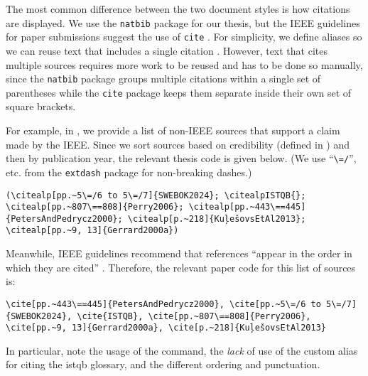 

The most common difference between the two document styles is how citations are
displayed. We use the \texttt{natbib} package for our thesis, but the IEEE
guidelines for paper submissions suggest the use of \texttt{cite}
\citep[p.~8]{Shell2015a}. For simplicity, we define aliases so we can reuse
text that includes a single citation
. However, text that
cites multiple sources requires more work to be reused and has to be done so
manually, since the \texttt{natbib} package groups multiple citations within a
single set of parentheses while the \texttt{cite} package keeps them separate
inside their own set of square brackets.

For example, in , we provide a list of non-IEEE sources
that support a claim made by the IEEE. Since we sort sources based on
credibility (defined in ) and then by publication year, the
relevant thesis code is given below. (We use ``\texttt{\textbackslash =/}'',
etc. from the \texttt{extdash} package for non-breaking dashes.)
\begin{displayquote}
    \texttt{(\textbackslash citealp[pp.\textasciitilde 5\textbackslash =/6 to 5\textbackslash =/7]\{SWEBOK2024\};
        \displayNL \textbackslash citealpISTQB\{\};
        \textbackslash citealp[pp.\textasciitilde 807\textbackslash ==808]\{Perry2006\};
        \displayNL \textbackslash citealp[pp.\textasciitilde 443\textbackslash ==445]\{PetersAndPedrycz2000\};
        \displayNL \textbackslash citealp[p.\textasciitilde 218]\{KuļešovsEtAl2013\}; %
        \displayNL \textbackslash citealp[pp.\textasciitilde 9, 13]\{Gerrard2000a\})}
\end{displayquote}
Meanwhile, IEEE guidelines recommend that references ``appear in the order in
which they are cited'' \citep[p.~1]{Shell2015b}. Therefore, the relevant paper
code for this list of sources is:
\begin{displayquote}
    \texttt{\textbackslash cite[pp.\textasciitilde 443\textbackslash ==445]\{PetersAndPedrycz2000\},
        \displayNL \textbackslash cite[pp.\textasciitilde 5\textbackslash =/6 to 5\textbackslash =/7]\{SWEBOK2024\},
        \textbackslash cite\{ISTQB\},
        \displayNL \textbackslash cite[pp.\textasciitilde 807\textbackslash ==808]\{Perry2006\},
        \displayNL \textbackslash cite[pp.\textasciitilde 9, 13]\{Gerrard2000a\},
        \displayNL \textbackslash cite[p.\textasciitilde 218]\{KuļešovsEtAl2013\}}
\end{displayquote}\utd{}In particular, note the usage of the 
command, the \emph{lack} of use of the custom alias for citing the \acs{istqb}
glossary, and the different ordering and punctuation.
